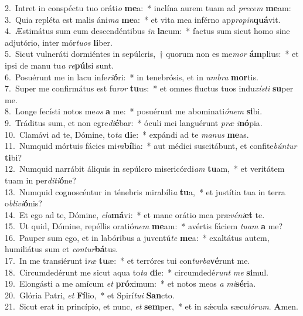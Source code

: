 {2.~}Intret in conspéctu tuo oráti\textit{o} \textbf{me}a:~* inclína aurem tuam ad \textit{pre}\textit{cem} \textbf{me}am:\\
{3.~}Quia repléta est malis áni\textit{ma} \textbf{me}a:~* et vita mea inférno ap\textit{pro}\textit{pin}\textbf{quá}vit.\\
{4.~}Æstimátus sum cum descendéntibus \textit{in} \textbf{la}cum:~* factus sum sicut homo sine adjutório, inter mór\textit{tu}\textit{os} \textbf{li}ber.\\
{5.~}Sicut vulneráti dormiéntes in sepúlcris,~† quorum non es me\textit{mor} \textbf{ám}plius:~* et ipsi de manu tu\textit{a} \textit{re}\textbf{púl}si sunt.\\
{6.~}Posuérunt me in lacu infe\textit{ri}\textbf{ó}ri:~* in tenebrósis, et in \textit{um}\textit{bra} \textbf{mor}tis.\\
{7.~}Super me confirmátus est fu\textit{ror} \textbf{tu}us:~* et omnes fluctus tuos indu\textit{xí}\textit{sti} \textbf{su}per me.\\
{8.~}Longe fecísti notos me\textit{os} \textbf{a} me:~* posuérunt me abominati\textit{ó}\textit{nem} \textbf{si}bi.\\
{9.~}Tráditus sum, et non egre\textit{di}\textbf{é}bar:~* óculi mei languérunt \textit{præ} \textit{i}\textbf{nó}pia.\\
{10.~}Clamávi ad te, Dómine, to\textit{ta} \textbf{di}e:~* expándi ad te \textit{ma}\textit{nus} \textbf{me}as.\\
{11.~}Numquid mórtuis fácies mi\textit{ra}\textbf{bí}lia:~* aut médici suscitábunt, et confite\textit{bún}\textit{tur} \textbf{ti}bi?\\
{12.~}Numquid narrábit áliquis in sepúlcro misericórdi\textit{am} \textbf{tu}am,~* et veritátem tuam in per\textit{di}\textit{ti}\textbf{ó}ne?\\
{13.~}Numquid cognoscéntur in ténebris mirabíli\textit{a} \textbf{tu}a,~* et justítia tua in terra o\textit{bli}\textit{vi}\textbf{ó}nis?\\
{14.~}Et ego ad te, Dómine, \textit{cla}\textbf{má}vi:~* et mane orátio mea præ\textit{vé}\textit{ni}\textbf{et} te.\\
{15.~}Ut quid, Dómine, repéllis oratió\textit{nem} \textbf{me}am:~* avértis fáciem \textit{tu}\textit{am} \textbf{a} me?\\
{16.~}Pauper sum ego, et in labóribus a juventú\textit{te} \textbf{me}a:~* exaltátus autem, humiliátus sum et \textit{con}\textit{tur}\textbf{bá}tus.\\
{17.~}In me transiérunt i\textit{ræ} \textbf{tu}æ:~* et terróres tui con\textit{tur}\textit{ba}\textbf{vé}runt me.\\
{18.~}Circumdedérunt me sicut aqua to\textit{ta} \textbf{di}e:~* circumdedé\textit{runt} \textit{me} \textbf{si}mul.\\
{19.~}Elongásti a me amícum \textit{et} \textbf{pró}ximum:~* et notos meos \textit{a} \textit{mi}\textbf{sé}ria.\\
{20.~}Glória Patri, \textit{et} \textbf{Fí}lio,~* et Spirí\textit{tu}\textit{i} \textbf{San}cto.\\
{21.~}Sicut erat in princípio, et nunc, \textit{et} \textbf{sem}per,~* et in sǽcula sæcu\textit{ló}\textit{rum}. \textbf{A}men.\\
